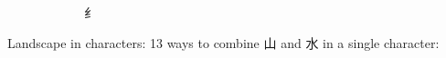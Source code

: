 \begin{multicols}{2}
{{\cnsym{}　}{\cnsym{}　}{\cnsym{}　}{\cnsym{}　}{\cnsym{}　}{\cnsym{}　}{纟}}
\endgroup{}
\end{multicols}



Landscape in characters: 13 ways to combine {\cjk{}山} and {\cjk{}水} in a single character:

